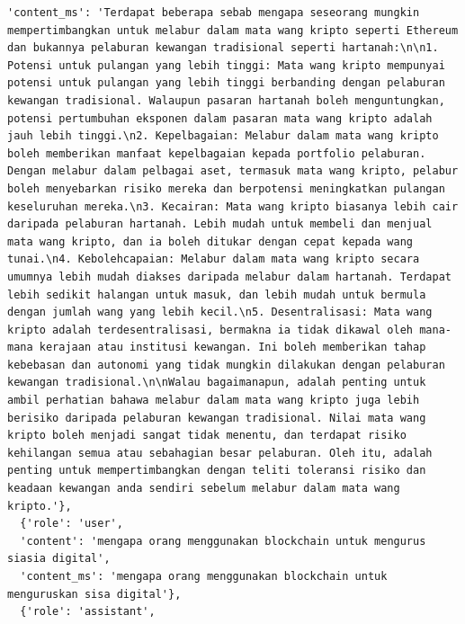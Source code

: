 \documentclass[preprint]{article}
\begin{document}
\begin{lstlisting}[breaklines=true]
  'content_ms': 'Terdapat beberapa sebab mengapa seseorang mungkin mempertimbangkan untuk melabur dalam mata wang kripto seperti Ethereum dan bukannya pelaburan kewangan tradisional seperti hartanah:\n\n1. Potensi untuk pulangan yang lebih tinggi: Mata wang kripto mempunyai potensi untuk pulangan yang lebih tinggi berbanding dengan pelaburan kewangan tradisional. Walaupun pasaran hartanah boleh menguntungkan, potensi pertumbuhan eksponen dalam pasaran mata wang kripto adalah jauh lebih tinggi.\n2. Kepelbagaian: Melabur dalam mata wang kripto boleh memberikan manfaat kepelbagaian kepada portfolio pelaburan. Dengan melabur dalam pelbagai aset, termasuk mata wang kripto, pelabur boleh menyebarkan risiko mereka dan berpotensi meningkatkan pulangan keseluruhan mereka.\n3. Kecairan: Mata wang kripto biasanya lebih cair daripada pelaburan hartanah. Lebih mudah untuk membeli dan menjual mata wang kripto, dan ia boleh ditukar dengan cepat kepada wang tunai.\n4. Kebolehcapaian: Melabur dalam mata wang kripto secara umumnya lebih mudah diakses daripada melabur dalam hartanah. Terdapat lebih sedikit halangan untuk masuk, dan lebih mudah untuk bermula dengan jumlah wang yang lebih kecil.\n5. Desentralisasi: Mata wang kripto adalah terdesentralisasi, bermakna ia tidak dikawal oleh mana-mana kerajaan atau institusi kewangan. Ini boleh memberikan tahap kebebasan dan autonomi yang tidak mungkin dilakukan dengan pelaburan kewangan tradisional.\n\nWalau bagaimanapun, adalah penting untuk ambil perhatian bahawa melabur dalam mata wang kripto juga lebih berisiko daripada pelaburan kewangan tradisional. Nilai mata wang kripto boleh menjadi sangat tidak menentu, dan terdapat risiko kehilangan semua atau sebahagian besar pelaburan. Oleh itu, adalah penting untuk mempertimbangkan dengan teliti toleransi risiko dan keadaan kewangan anda sendiri sebelum melabur dalam mata wang kripto.'},
  {'role': 'user',
  'content': 'mengapa orang menggunakan blockchain untuk mengurus siasia digital',
  'content_ms': 'mengapa orang menggunakan blockchain untuk menguruskan sisa digital'},
  {'role': 'assistant',

\end{lstlisting}
\end{document}
